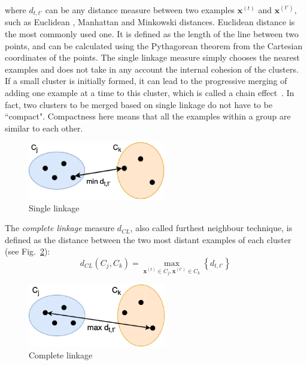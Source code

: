 \noindent
where $d_{t,t'}$ can be any distance measure between two examples $\mathbf{x}^{\left ( t \right )}$ and $\mathbf{x}^{\left ( t' \right )}$, such as Euclidean , Manhattan and Minkowski distances. Euclidean distance is the most commonly used one. It is defined as the length of the line between two points, and can be calculated using the Pythagorean theorem from the Cartesian coordinates of the points. The single linkage measure simply chooses the nearest examples and does not take in any account the internal cohesion of the clusters. If a small cluster is initially formed, it can lead to the progressive merging of adding one example at a time to this cluster, which is called a chain effect~\cite{Marini2020}. In fact, two clusters to be merged based on single linkage do not have to be ``compact". Compactness here means that all the examples within a group are similar to each other.

\begin{figure}[htp]
\centering
\captionsetup{justification=centering}
\includegraphics[width=6cm]{"Part 3 - Learning Systems/Unsupervised Learning/Hierarchical Clustering/figures/SingleLinkage.png"}
\caption{Single linkage}
\label{fig:sl}
\end{figure}

The \textit{complete linkage} measure $d_{CL}$, also called furthest neighbour technique, is defined as the distance between the two most distant examples of each cluster (see Fig.~\ref{fig:cl}):
\[
d_{CL}\left ( C_j, C_k \right ) = \max_{\mathbf{x}^{\left ( t \right )} \in C_j, \mathbf{x}^{\left ( t' \right )} \in C_k} \left\{ d_{t,t'} \right\}
\]

\begin{figure}[htp]
\centering
\captionsetup{justification=centering}
\includegraphics[width=6cm]{"Part 3 - Learning Systems/Unsupervised Learning/Hierarchical Clustering/figures/CompleteLinkage.png"}
\caption{Complete linkage}
\label{fig:cl}
\end{figure}

